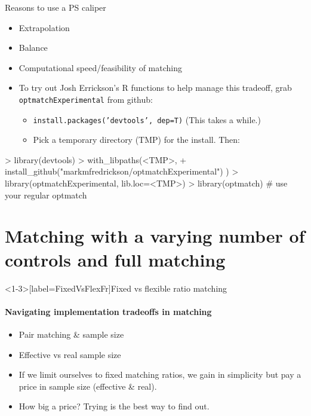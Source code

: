 \begin{frame}[fragile]{Reasons to use a PS caliper}

  \begin{itemize}[<+->]
  \item Extrapolation
  \item Balance
  \item Computational speed/feasibility of matching
  \item To try out Josh Errickson's R functions to help manage
      this tradeoff, grab \texttt{optmatchExperimental} from github:
      \begin{itemize}
      \item       \texttt{install.packages('devtools', dep=T)} (This takes a while.)
      \item Pick a temporary directory (TMP) for the install. Then:
      \end{itemize}
  \end{itemize}

\begin{semiverbatim}
> library(devtools)
> with\_libpaths(<TMP>,
+   install\_github("markmfredrickson/optmatchExperimental") )
> library(optmatchExperimental, lib.loc=<TMP>)
> library(optmatch) \# use your regular optmatch
\end{semiverbatim}
  
\end{frame}

\section[full matching]{Matching with a varying number of controls and full matching}

\begin{frame}<1-3>[label=FixedVsFlexFr]{Fixed vs flexible ratio matching}
\framesubtitle{Navigating implementation tradeoffs in matching}  

\begin{itemize}[<+->]
\item Pair matching \& sample size
\item Effective vs real sample size
\item If we limit ourselves to fixed matching ratios, we gain in
  simplicity but pay a price in sample size (effective \& real).
\item How big a price?  Trying is the best way to find out.
\end{itemize}

\end{frame}

